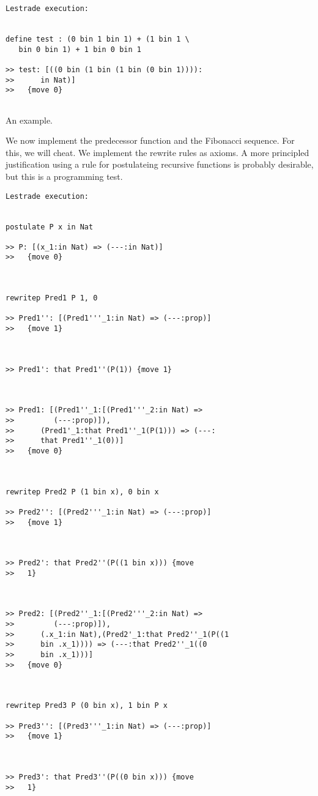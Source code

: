 \documentclass{article}
\begin{document}
\begin{verbatim}Lestrade execution:


define test : (0 bin 1 bin 1) + (1 bin 1 \
   bin 0 bin 1) + 1 bin 0 bin 1

>> test: [((0 bin (1 bin (1 bin (0 bin 1)))):
>>      in Nat)]
>>   {move 0}


\end{verbatim}

An example.

We now implement the predecessor function and the Fibonacci sequence.  For this, we will cheat.  We implement the rewrite rules as axioms.
A more principled justification using a rule for postulateing recursive functions is probably desirable, but this is a programming test.

\begin{verbatim}Lestrade execution:


postulate P x in Nat

>> P: [(x_1:in Nat) => (---:in Nat)]
>>   {move 0}



rewritep Pred1 P 1, 0

>> Pred1'': [(Pred1'''_1:in Nat) => (---:prop)]
>>   {move 1}



>> Pred1': that Pred1''(P(1)) {move 1}



>> Pred1: [(Pred1''_1:[(Pred1'''_2:in Nat) =>
>>         (---:prop)]),
>>      (Pred1'_1:that Pred1''_1(P(1))) => (---:
>>      that Pred1''_1(0))]
>>   {move 0}



rewritep Pred2 P (1 bin x), 0 bin x

>> Pred2'': [(Pred2'''_1:in Nat) => (---:prop)]
>>   {move 1}



>> Pred2': that Pred2''(P((1 bin x))) {move
>>   1}



>> Pred2: [(Pred2''_1:[(Pred2'''_2:in Nat) =>
>>         (---:prop)]),
>>      (.x_1:in Nat),(Pred2'_1:that Pred2''_1(P((1
>>      bin .x_1)))) => (---:that Pred2''_1((0
>>      bin .x_1)))]
>>   {move 0}



rewritep Pred3 P (0 bin x), 1 bin P x

>> Pred3'': [(Pred3'''_1:in Nat) => (---:prop)]
>>   {move 1}



>> Pred3': that Pred3''(P((0 bin x))) {move
>>   1}




\end{verbatim}
\end{document}
